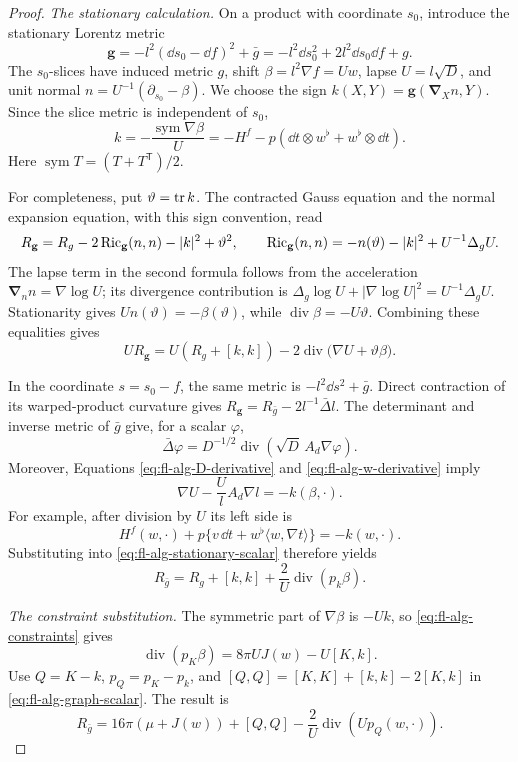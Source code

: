 \begin{proof}
\emph{The stationary calculation.}
On a product with coordinate \(s_0\), introduce the stationary Lorentz
metric
\[
 \mathbf g=-l^2(\dd s_0-\dd f)^2+\bar g
           =-l^2\dd s_0^2+2l^2\dd s_0\dd f+g.
\]
The \(s_0\)-slices have induced metric \(g\), shift
\(\beta=l^2\nabla f=Uw\), lapse \(U=l\sqrt D\), and unit normal
\(n=U^{-1}(\partial_{s_0}-\beta)\). We choose the sign
\(k(X,Y)=\mathbf g(\mathbf\nabla_Xn,Y)\).
Since the slice metric is independent of \(s_0\),
\[
 k=-\frac{\operatorname{sym}\nabla\beta}{U}
   =-H^f-p(\dd t\otimes w^\flat+w^\flat\otimes\dd t).
\]
Here \(\operatorname{sym}T=(T+T^{\mathsf T})/2\).

For completeness, put \(\vartheta=\operatorname{tr} k\). The contracted Gauss
equation and the normal expansion equation, with this sign convention,
read
\[
 R_{\mathbf g}=R_g-2\operatorname{Ric}_{\mathbf g}(n,n)-|k|^2+\vartheta^2,
 \qquad
 \operatorname{Ric}_{\mathbf g}(n,n)=-n(\vartheta)-|k|^2+U^{-1}\Delta_gU.
\]
The lapse term in the second formula follows from the acceleration
\(\mathbf\nabla_n n=\nabla\log U\); its divergence contribution is
\(\Delta_g\log U+|\nabla\log U|^2=U^{-1}\Delta_gU\).
Stationarity gives \(Un(\vartheta)=-\beta(\vartheta)\), while
\(\operatorname{div}\beta=-U\vartheta\).
Combining these equalities gives
\begin{equation}
 UR_{\mathbf g}
 =U(R_g+[k,k])
   -2\operatorname{div}\bigl(\nabla U+\vartheta\beta\bigr).
 \label{eq:fl-alg-stationary-scalar}
\end{equation}

In the coordinate \(s=s_0-f\), the same metric is
\(-l^2\dd s^2+\bar g\). Direct contraction of its warped-product
curvature gives
\(R_{\mathbf g}=R_{\bar g}-2l^{-1}\bar\Delta l\).
The determinant and inverse metric of \(\bar g\) give, for a scalar
\(\varphi\),
\[
 \bar\Delta\varphi
 =D^{-1/2}\operatorname{div}(\sqrt D\,A_d\nabla\varphi).
\]
Moreover, Equations \eqref{eq:fl-alg-D-derivative} and
\eqref{eq:fl-alg-w-derivative} imply
\[
 \nabla U-\frac Ul A_d\nabla l=-k(\beta,\cdot).
\]
For example, after division by \(U\) its left side is
\[
 H^f(w,\cdot)+p\{v\,\dd t+w^\flat\langle w,\nabla t\rangle\}
 =-k(w,\cdot).
\]
Substituting into \eqref{eq:fl-alg-stationary-scalar} therefore yields
\begin{equation}
 R_{\bar g}=R_g+[k,k]+\frac2U\operatorname{div}(p_k\beta).
 \label{eq:fl-alg-graph-scalar}
\end{equation}

\emph{The constraint substitution.}
The symmetric part of \(\nabla\beta\) is \(-Uk\), so
\eqref{eq:fl-alg-constraints} gives
\[
 \operatorname{div}(p_K\beta)
 =8\pi UJ(w)-U[K,k].
\]
Use \(Q=K-k\), \(p_Q=p_K-p_k\), and
\([Q,Q]=[K,K]+[k,k]-2[K,k]\) in
\eqref{eq:fl-alg-graph-scalar}. The result is
\begin{equation}
 R_{\bar g}
 =16\pi(\mu+J(w))+[Q,Q]
      -\frac2U\operatorname{div}(Up_Q(w,\cdot)).
 \label{eq:fl-alg-constraint-graph}
\end{equation}


\end{proof}
